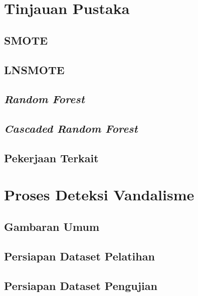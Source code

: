 \documentclass[12pt,a4paper,titlepage]{report}
\begin{document}
\chapter{Tinjauan Pustaka}
\label{bab:02}


\section{SMOTE}


\section{LNSMOTE}


\section{\textit{Random Forest}}


\section{\textit{Cascaded Random Forest}}


\newpage
\section{Pekerjaan Terkait}


\chapter{Proses Deteksi Vandalisme}
\label{chapter:proses}



\section{Gambaran Umum}
\label{bab:03:gambaran_umum}


\section{Persiapan Dataset Pelatihan}


\section{Persiapan Dataset Pengujian}

\end{document}
